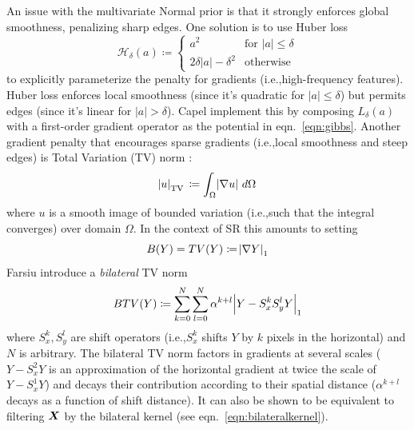 An issue with the multivariate Normal prior is that it strongly enforces global smoothness, penalizing sharp edges.
%
One solution is to use Huber loss \cite{huber1964}
\begin{equation}
    \mathcal{H}_{\delta }(a)\coloneqq {
        \begin{cases}
            a^2                                 & \text{for }\lvert a \rvert \leq \delta \\
            2 \delta \lvert a \rvert - \delta^2 & {\text{otherwise}}
        \end{cases}
    }
\end{equation}
to explicitly parameterize the penalty for gradients (i.e.,high-frequency features).
%
Huber loss enforces local smoothness (since it's quadratic for \(\lvert a \rvert \leq \delta\)) but permits edges (since it's linear for \(\lvert a \rvert > \delta\)).
%
Capel \etal \cite{capel2000} implement this by composing \(L_{\delta }(a)\) with a first-order gradient operator as the potential in eqn.~\eqref{eqn:gibbs}.
%
Another gradient penalty that encourages sparse gradients (i.e.,local smoothness and steep edges) is Total Variation (TV) norm \cite{RUDIN1992259}:
\begin{equation}
    \abs{u}_{\operatorname {TV}}\,\coloneqq\int _{\Omega }\abs{\nabla u}\,d\Omega
\end{equation}
where \(u\) is a smooth image of bounded variation (i.e.,such that the integral converges) over domain \(\Omega\).
%
In the context of SR this amounts to setting
\begin{equation}
    B(Y) = TV(Y) \coloneqq \abs{ \nabla Y }_1
\end{equation}
%
Farsiu \etal \cite{farsiu} introduce a \textit{bilateral} TV norm
\begin{equation}
    BTV(Y) \coloneqq \sum_{k=0}^{N} \sum_{l=0}^{N} \alpha^{k + l} \abs{ Y - S_x^k S_y^l Y }_1
\end{equation}
where \(S_x^k, S_y^l\) are shift operators (i.e.,\(S_x^k\) shifts \(Y\) by \(k\) pixels in the horizontal) and \(N\) is arbitrary.
%
The bilateral TV norm factors in gradients at several scales (\(Y - S_x^2 Y\) is an approximation of the horizontal gradient at twice the scale of \(Y - S_x^1 Y\)) and decays their contribution according to their spatial distance (\(\alpha^{k+l}\) decays as a function of shift distance).
%
It can also be shown to be equivalent \cite{elad2002} to filtering \(\bm{X}\) by the bilateral kernel (see eqn.~\eqref{eqn:bilateralkernel}).

